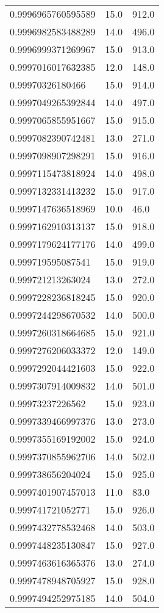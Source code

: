 \begin{center}
\begin{supertabular}[H]{p{0.30\textwidth}p{0.05\textwidth}p{0.05\textwidth}}
0.9996965760595589 & 15.0 & 912.0 \\ 
0.9996982583488289 & 14.0 & 496.0 \\ 
0.9996999371269967 & 15.0 & 913.0 \\ 
0.9997016017632385 & 12.0 & 148.0 \\ 
0.99970326180466 & 15.0 & 914.0 \\ 
0.9997049265392844 & 14.0 & 497.0 \\ 
0.9997065855951667 & 15.0 & 915.0 \\ 
0.9997082390742481 & 13.0 & 271.0 \\ 
0.9997098907298291 & 15.0 & 916.0 \\ 
0.9997115473818924 & 14.0 & 498.0 \\ 
0.9997132331413232 & 15.0 & 917.0 \\ 
0.9997147636518969 & 10.0 & 46.0 \\ 
0.9997162910313137 & 15.0 & 918.0 \\ 
0.9997179624177176 & 14.0 & 499.0 \\ 
0.999719595087541 & 15.0 & 919.0 \\ 
0.999721213263024 & 13.0 & 272.0 \\ 
0.9997228236818245 & 15.0 & 920.0 \\ 
0.9997244298670532 & 14.0 & 500.0 \\ 
0.9997260318664685 & 15.0 & 921.0 \\ 
0.9997276206033372 & 12.0 & 149.0 \\ 
0.9997292044421603 & 15.0 & 922.0 \\ 
0.9997307914009832 & 14.0 & 501.0 \\ 
0.99973237226562 & 15.0 & 923.0 \\ 
0.9997339466997376 & 13.0 & 273.0 \\ 
0.9997355169192002 & 15.0 & 924.0 \\ 
0.9997370855962706 & 14.0 & 502.0 \\ 
0.999738656204024 & 15.0 & 925.0 \\ 
0.9997401907457013 & 11.0 & 83.0 \\ 
0.999741721052771 & 15.0 & 926.0 \\ 
0.9997432778532468 & 14.0 & 503.0 \\ 
0.9997448235130847 & 15.0 & 927.0 \\ 
0.9997463616365376 & 13.0 & 274.0 \\ 
0.9997478948705927 & 15.0 & 928.0 \\ 
0.9997494252975185 & 14.0 & 504.0 \\ 

\end{supertabular}
\end{center}
